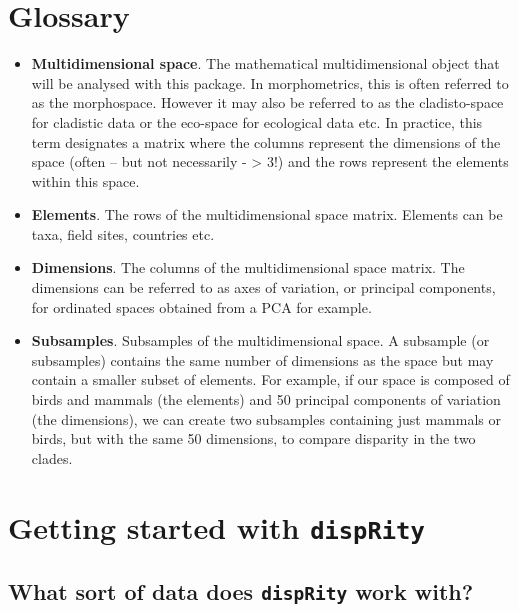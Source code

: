 \documentclass[]{book}
\theoremstyle{definition}
\theoremstyle{definition}
\theoremstyle{remark}
\begin{document}
\chapter{Glossary}\label{glossary}

\begin{itemize}
\item
  \textbf{Multidimensional space}. The mathematical multidimensional
  object that will be analysed with this package. In morphometrics, this
  is often referred to as the morphospace. However it may also be
  referred to as the cladisto-space for cladistic data or the eco-space
  for ecological data etc. In practice, this term designates a matrix
  where the columns represent the dimensions of the space (often -- but
  not necessarily - \textgreater{} 3!) and the rows represent the
  elements within this space.
\item
  \textbf{Elements}. The rows of the multidimensional space matrix.
  Elements can be taxa, field sites, countries etc.
\item
  \textbf{Dimensions}. The columns of the multidimensional space matrix.
  The dimensions can be referred to as axes of variation, or principal
  components, for ordinated spaces obtained from a PCA for example.
\item
  \textbf{Subsamples}. Subsamples of the multidimensional space. A
  subsample (or subsamples) contains the same number of dimensions as
  the space but may contain a smaller subset of elements. For example,
  if our space is composed of birds and mammals (the elements) and 50
  principal components of variation (the dimensions), we can create two
  subsamples containing just mammals or birds, but with the same 50
  dimensions, to compare disparity in the two clades.
\end{itemize}

\chapter{\texorpdfstring{Getting started with
\texttt{dispRity}}{Getting started with dispRity}}\label{getting-started-with-disprity}

\section{\texorpdfstring{What sort of data does \texttt{dispRity} work
with?}{What sort of data does dispRity work with?}}\label{what-sort-of-data-does-disprity-work-with}
\end{document}
